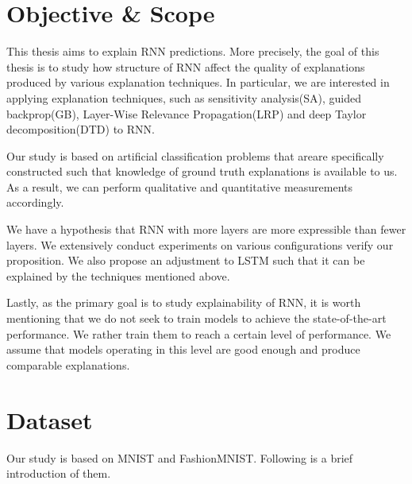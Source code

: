 %
%
%
%


\section{Objective \& Scope}
This thesis aims to explain RNN predictions. More precisely, the goal of this thesis is to study how structure of RNN affect the quality of explanations produced by various explanation techniques. In particular, we are interested in applying explanation techniques, such as sensitivity analysis(SA), guided backprop(GB), Layer-Wise Relevance Propagation(LRP) and deep Taylor decomposition(DTD) to RNN. 

Our study is based on artificial classification problems that areare specifically constructed such that  knowledge of ground truth explanations is available to us. As a result, we can perform qualitative and quantitative measurements accordingly.


We have a hypothesis that RNN with more layers are more expressible than fewer layers. We extensively conduct experiments on various configurations verify our proposition. We also propose an adjustment to LSTM such that it can be explained by the techniques mentioned above.

Lastly, as the primary goal is to study explainability of RNN, it is worth mentioning that we do not seek to train models to achieve the state-of-the-art performance. We rather train them to reach a certain level of performance. We assume that models operating in this level are good enough and produce comparable explanations.


%
%
%


\section{Dataset}
Our study is based on MNIST\cite{LeCunMNISThandwrittendigit2010} and FashionMNIST\cite{XiaoFashionMNISTNovelImage2017}. Following is a brief introduction of them.

